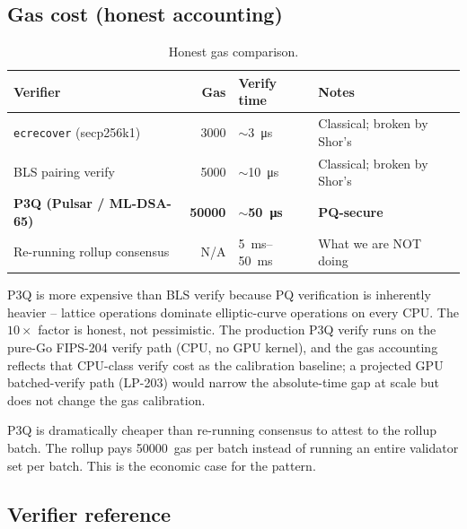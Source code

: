 \subsection{Gas cost (honest accounting)}

\begin{table}[h]
\centering
\small
\begin{tabular}{@{}lrll@{}}
\toprule
\textbf{Verifier} & \textbf{Gas} & \textbf{Verify time} & \textbf{Notes} \\
\midrule
\texttt{ecrecover} (secp256k1) & \SI{3000}{} & $\sim$\SI{3}{\micro\second} & Classical; broken by Shor's \\
BLS pairing verify & \SI{5000}{} & $\sim$\SI{10}{\micro\second} & Classical; broken by Shor's \\
\textbf{P3Q (Pulsar / ML-DSA-65)} & \textbf{\SI{50000}{}} & \textbf{$\sim$\SI{50}{\micro\second}} & \textbf{PQ-secure} \\
Re-running rollup consensus & N/A & \SI{5}{\milli\second}--\SI{50}{\milli\second} & What we are NOT doing \\
\bottomrule
\end{tabular}
\caption{Honest gas comparison.}
\label{tab:gas}
\end{table}

P3Q is more expensive than BLS verify because PQ verification is
inherently heavier -- lattice operations dominate elliptic-curve
operations on every CPU. The $10\times$ factor is
honest, not pessimistic. The production P3Q verify runs on the
pure-Go FIPS-204 verify path (CPU, no GPU kernel), and the gas
accounting reflects that CPU-class verify cost as the calibration
baseline; a projected GPU batched-verify path (LP-203) would narrow
the absolute-time gap at scale but does not change the gas
calibration.

P3Q is dramatically cheaper than re-running consensus to attest to
the rollup batch. The rollup pays \SI{50000}{gas} per batch instead
of running an entire validator set per batch. This is the economic
case for the pattern.

\subsection{Verifier reference}

